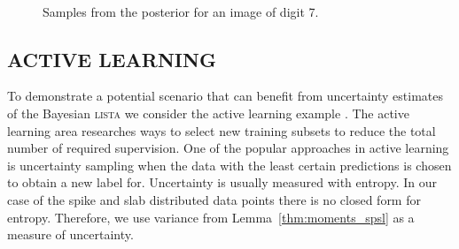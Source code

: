 \documentclass[letterpaper]{article}
\begin{document}
\begin{figure}[t]
\centering
{}~
~
\caption{Samples from the posterior for an image of digit 7.}
\label{fig:posterior_samples}
\end{figure}

\subsection{\uppercase{Active learning}}
To demonstrate a potential scenario that can benefit from uncertainty estimates of the Bayesian \textsc{lista} we consider the active learning example \citep{settles.tr09}. The active learning area researches ways to select new training subsets to reduce the total number of required supervision. One of the popular approaches in active learning is uncertainty sampling when the data with the least certain predictions is chosen to obtain a new label for. Uncertainty is usually measured with entropy. In our case of the spike and slab distributed data points there is no closed form for entropy. Therefore, we use variance from Lemma~\ref{thm:moments_spsl} as a measure of uncertainty.
\end{document}
